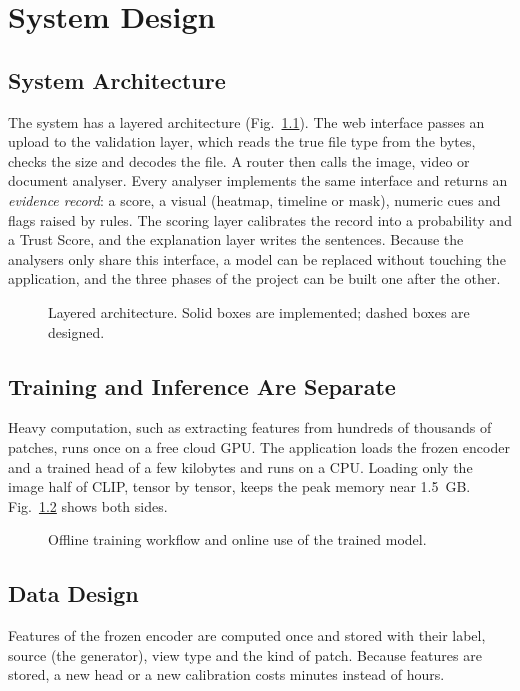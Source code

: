 \chapter{System Design}

\section{System Architecture}
The system has a layered architecture (Fig.~\ref{fig:arch}). The web interface passes an upload to the validation layer, which reads the true file type from the bytes, checks the size and decodes the file. A router then calls the image, video or document analyser. Every analyser implements the same interface and returns an \emph{evidence record}: a score, a visual (heatmap, timeline or mask), numeric cues and flags raised by rules. The scoring layer calibrates the record into a probability and a Trust Score, and the explanation layer writes the sentences. Because the analysers only share this interface, a model can be replaced without touching the application, and the three phases of the project can be built one after the other.

\begin{figure}[htbp]
  \centering
  
  \caption{Layered architecture. Solid boxes are implemented; dashed boxes are designed.}\label{fig:arch}
\end{figure}

\section{Training and Inference Are Separate}
Heavy computation, such as extracting features from hundreds of thousands of patches, runs once on a free cloud GPU. The application loads the frozen encoder and a trained head of a few kilobytes and runs on a CPU. Loading only the image half of CLIP, tensor by tensor, keeps the peak memory near 1.5~GB. Fig.~\ref{fig:train} shows both sides.

\begin{figure}[htbp]
  \centering
  
  \caption{Offline training workflow and online use of the trained model.}\label{fig:train}
\end{figure}

\section{Data Design}
Features of the frozen encoder are computed once and stored with their label, source (the generator), view type and the kind of patch. Because features are stored, a new head or a new calibration costs minutes instead of hours.

